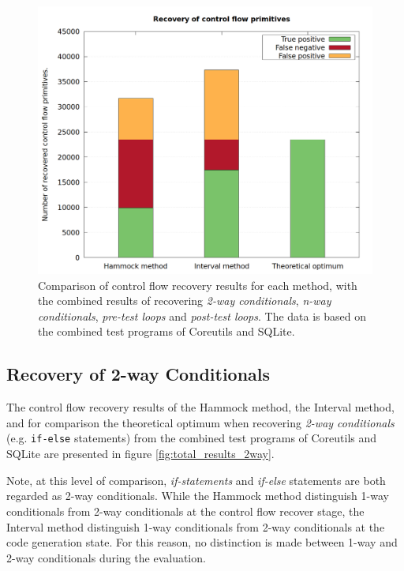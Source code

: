 \begin{figure}[htbp]
	\centering
	\includegraphics[width=\textwidth]{inc/5_results/results_combined.png}
	\caption{Comparison of control flow recovery results for each method, with the combined results of recovering \textit{2-way conditionals}, \textit{n-way conditionals}, \textit{pre-test loops} and \textit{post-test loops}. The data is based on the combined test programs of Coreutils and SQLite.}
	\label{fig:total_results_combined}
\end{figure}

\clearpage

\subsection{Recovery of 2-way Conditionals}

The control flow recovery results of the Hammock method, the Interval method, and for comparison the theoretical optimum when recovering \textit{2-way conditionals} (e.g. \texttt{if-else} statements) from the combined test programs of Coreutils and SQLite are presented in figure \ref{fig:total_results_2way}.

Note, at this level of comparison, \textit{if-statements} and \textit{if-else} statements are both regarded as 2-way conditionals. While the Hammock method distinguish 1-way conditionals from 2-way conditionals at the control flow recover stage, the Interval method distinguish 1-way conditionals from 2-way conditionals at the code generation state. For this reason, no distinction is made between 1-way and 2-way conditionals during the evaluation.


